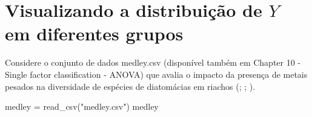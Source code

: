 \documentclass[
]{book}
\newenvironment{Shaded}{\begin{snugshade}}{\end{snugshade}}
\newcommand{\FunctionTok}[1]{\textcolor[rgb]{0.00,0.00,0.00}{#1}}
\newcommand{\NormalTok}[1]{#1}
\newcommand{\OtherTok}[1]{\textcolor[rgb]{0.56,0.35,0.01}{#1}}
\newcommand{\StringTok}[1]{\textcolor[rgb]{0.31,0.60,0.02}{#1}}
\begin{document}
\hypertarget{visualizando-a-distribuiuxe7uxe3o-de-y-em-diferentes-grupos}{%
\section{\texorpdfstring{Visualizando a distribuição de \(Y\) em diferentes grupos}{Visualizando a distribuição de Y em diferentes grupos}}\label{visualizando-a-distribuiuxe7uxe3o-de-y-em-diferentes-grupos}}

Considere o conjunto de dados medley.csv (disponível também em Chapter 10 - Single factor classification - ANOVA) que avalia o impacto da presença de metais pesados na diversidade de espécies de diatomácias em riachos (\citet{medleyclements1998}; \citet{queen2002experimental}; \citet{logan2011biostatistical}).

\begin{Shaded}
\begin{Highlighting}[]
\NormalTok{medley }\OtherTok{=} \FunctionTok{read\_csv}\NormalTok{(}\StringTok{"medley.csv"}\NormalTok{)}
\NormalTok{medley}
\end{Highlighting}
\end{Shaded}
\end{document}
